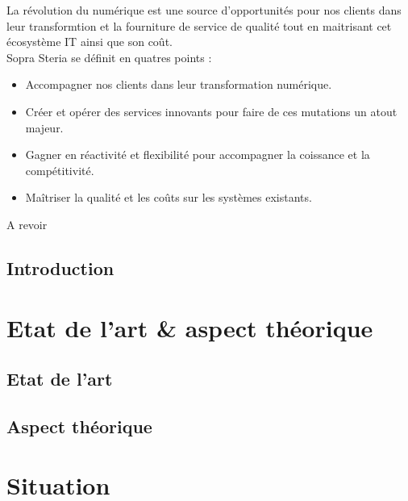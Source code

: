 \documentclass[a4paper]{memoir}
\begin{document}
La révolution du numérique est une source d'opportunités pour nos clients dans leur transformtion et la fourniture de service de qualité tout en maitrisant cet écosystème IT ainsi que son coût.\\
Sopra Steria se définit en quatres points :

\begin{itemize}
    \item Accompagner nos clients dans leur transformation numérique.
    \item Créer et opérer des services innovants pour faire de ces mutations un atout majeur.
    \item Gagner en réactivité et flexibilité pour accompagner la coissance et la compétitivité.
    \item Maîtriser la qualité et les coûts sur les systèmes existants.
\end{itemize}

A revoir

\cleardoublepage
\tableofcontents*


\chapter*{Introduction}




\mainmatter%
\part{Etat de l'art \& aspect théorique}

\chapter{Etat de l'art}

\chapter{Aspect théorique}

\part{Situation}
\end{document}
